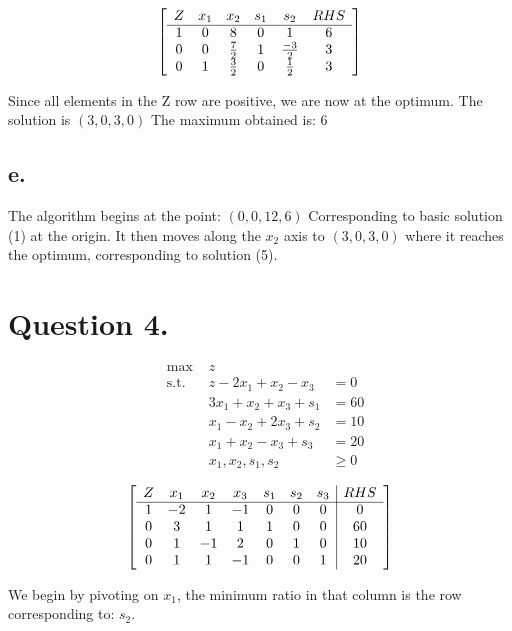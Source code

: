 \documentclass[10pt, letterpaper]{paper}
\begin{document}
\[
	\left[ {\begin{array}{cccccc}
	Z & x_1 & x_2 & s_1 & s_2 & RHS\\ \cline{1-6}
	1 & 0 & 8 & 0 & 1 & 6 \\
	0 & 0 & \frac{7}{2} & 1 & \frac{-3}{2} & 3 \\
	0 & 1 & \frac{3}{2} & 0 & \frac{1}{2} & 3 \\
	\end{array} } \right]
\]

Since all elements in the Z row are positive, we are now at the optimum. The solution is $(3,0,3,0)$
The maximum obtained is: 6

\subsection*{e.}
The algorithm begins at the point: $(0,0,12,6)$ Corresponding to basic solution (1) at the origin. It then moves along the $x_2$ axis to $(3,0,3,0)$ where it reaches the optimum, corresponding to solution (5). 

\section*{Question 4.}
\begin{equation*}
\begin{alignedat}{3}
&\text{max }&z&\\
&\text{s.t. } &z - 2x_1 + x_2 - x_3 &= 0 \\
& &3x_1 + x_2 + x_3 + s_1 &= 60\\
& &x_1 -x_2 + 2x_3 + s_2 &= 10\\
& &x_1 + x_2 - x_3 + s_3 &=20\\
& &x_1, x_2, s_1, s_2 &\geq 0
\end{alignedat}
\end{equation*}

\[
	\left[ {\begin{array}{ccccccc|c}
	Z & x_1 & x_2 & x_3 & s_1 & s_2 & s_3 & RHS\\ \cline{1-8}
	1 & -2 & 1 & -1 & 0 & 0 & 0 & 0\\
	0 & 3 & 1 & 1 & 1 & 0 & 0 & 60\\
	0 & 1 & -1 & 2 & 0 & 1 & 0 & 10\\
	0 & 1 & 1 & -1 & 0 & 0 & 1 & 20\\
	\end{array} } \right]
\]

We begin by pivoting on $x_1$, the minimum ratio in that column is the row corresponding to: $s_2$.
\end{document}
